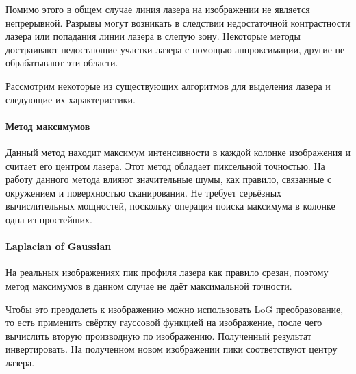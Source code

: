             Помимо этого в общем случае линия лазера на изображении не является непрерывной. Разрывы могут возникать в следствии недостаточной контрастности лазера или попадания линии лазера в слепую зону. Некоторые методы достраивают недостающие участки лазера с помощью аппроксимации, другие не обрабатывают эти области.
            
            Рассмотрим некоторые из существующих алгоритмов для выделения лазера и следующие их характеристики.
            
            
            \paragraph{Метод максимумов}
                Данный метод находит максимум интенсивности в каждой колонке изображения и считает его центром лазера. Этот метод обладает пиксельной точностью. На работу данного метода влияют значительные шумы, как правило, связанные с окружением и поверхностью сканирования. Не требует серьёзных вычислительных мощностей, поскольку операция поиска максимума в колонке одна из простейших.
            
            \paragraph{Laplacian of Gaussian}
                На реальных изображениях пик профиля лазера как правило срезан, поэтому метод максимумов в данном случае не даёт максимальной точности\cite{Molder2014}. 
                
                Чтобы это преодолеть к изображению можно использовать LoG преобразование, то есть применить свёртку гауссовой функцией на изображение, после чего вычислить вторую производную по изображению. Полученный результат инвертировать. На полученном новом изображении пики соответствуют центру лазера. 
                
